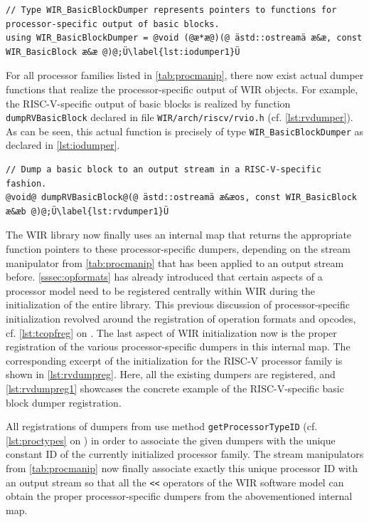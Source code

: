 \begin{lstlisting}[style=code,float=h,caption={Declaration of Basic Block Dumper Type in file \texttt{wirio.h}},label=lst:iodumper]
// Type WIR_BasicBlockDumper represents pointers to functions for processor-specific output of basic blocks.
using WIR_BasicBlockDumper = @void (@æ*æ@)(@ ästd::ostreamä æ&æ, const WIR_BasicBlock æ&æ @)@;Ü\label{lst:iodumper1}Ü
\end{lstlisting}

For all processor families listed in \cref{tab:procmanip}, there now exist actual dumper functions that realize the processor-specific output of \gls{WIR} objects.
For example, the RISC-V-specific output of basic blocks is realized by function \texttt{dumpRVBasicBlock} declared in file \texttt{WIR/arch/riscv/rvio.h} (cf. \cref{lst:rvdumper}).
As can be seen, this actual function is precisely of type \texttt{WIR\_BasicBlockDumper} as declared in \cref{lst:iodumper}.

\begin{lstlisting}[style=code,float=h,caption={Declaration of RISC-V-Specific Basic Block Dumper},label=lst:rvdumper]
// Dump a basic block to an output stream in a RISC-V-specific fashion.
@void@ dumpRVBasicBlock@(@ ästd::ostreamä æ&æos, const WIR_BasicBlock æ&æb @)@;Ü\label{lst:rvdumper1}Ü
\end{lstlisting}

The \gls{WIR} library now finally uses an internal map that returns the appropriate function pointers to these processor-specific dumpers, depending on the stream manipulator from \cref{tab:procmanip} that has been applied to an output stream before.
\cref{sssec:opformats} has already introduced that certain aspects of a processor model need to be registered centrally within \gls{WIR} during the initialization of the entire library.
This previous discussion of processor-specific initialization revolved around the registration of operation formats and opcodes, cf. \cref{lst:tcopfreg} on .
The last aspect of \gls{WIR} initialization now is the proper registration of the various processor-specific dumpers in this internal map.
The corresponding excerpt of the initialization for the RISC-V processor family is shown in \cref{lst:rvdumpreg}.
Here, all the existing dumpers are registered, and \cref{lst:rvdumpreg1} showcases the concrete example of the RISC-V-specific basic block dumper registration.

All registrations of dumpers from  use method \texttt{getProcessorTypeID} (cf. \cref{lst:proctypes} on ) in order to associate the given dumpers with the unique constant ID of the currently initialized processor family.
The stream manipulators from \cref{tab:procmanip} now finally associate exactly this unique processor ID with an output stream so that all the \texttt{<{}<} operators of the \gls{WIR} software model can obtain the proper processor-specific dumpers from the abovementioned internal map.

